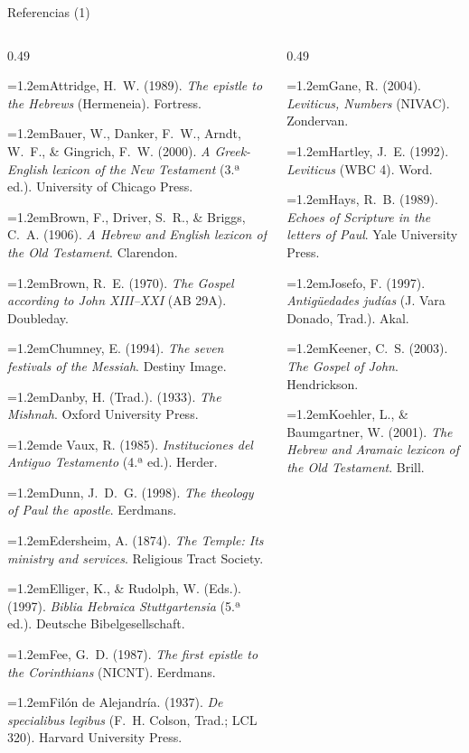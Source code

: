 \documentclass[hyperref={bookmarks=false},aspectratio=169]{beamer}
\newcommand{\refapa}[1]{\par{\RaggedRight\hangindent=1.2em\hangafter=1\noindent #1\par}\vspace{3pt}}
\begin{document}
\begin{frame}{Referencias (1)}
\fontsize{6.2}{7.4}\selectfont
\begin{columns}[t,onlytextwidth]
\begin{column}{0.49\textwidth}
\refapa{Attridge, H.~W. (1989). \emph{The epistle to the Hebrews} (Hermeneia). Fortress.}
\refapa{Bauer, W., Danker, F.~W., Arndt, W.~F., \& Gingrich, F.~W. (2000). \emph{A Greek-English lexicon of the New Testament} (3.ª ed.). University of Chicago Press.}
\refapa{Brown, F., Driver, S.~R., \& Briggs, C.~A. (1906). \emph{A Hebrew and English lexicon of the Old Testament}. Clarendon.}
\refapa{Brown, R.~E. (1970). \emph{The Gospel according to John XIII--XXI} (AB 29A). Doubleday.}
\refapa{Chumney, E. (1994). \emph{The seven festivals of the Messiah}. Destiny Image.}
\refapa{Danby, H. (Trad.). (1933). \emph{The Mishnah}. Oxford University Press.}
\refapa{de Vaux, R. (1985). \emph{Instituciones del Antiguo Testamento} (4.ª ed.). Herder.}
\refapa{Dunn, J.~D.~G. (1998). \emph{The theology of Paul the apostle}. Eerdmans.}
\refapa{Edersheim, A. (1874). \emph{The Temple: Its ministry and services}. Religious Tract Society.}
\refapa{Elliger, K., \& Rudolph, W. (Eds.). (1997). \emph{Biblia Hebraica Stuttgartensia} (5.ª ed.). Deutsche Bibelgesellschaft.}
\refapa{Fee, G.~D. (1987). \emph{The first epistle to the Corinthians} (NICNT). Eerdmans.}
\refapa{Filón de Alejandría. (1937). \emph{De specialibus legibus} (F.~H. Colson, Trad.; LCL 320). Harvard University Press.}
\end{column}
\begin{column}{0.49\textwidth}
\refapa{Gane, R. (2004). \emph{Leviticus, Numbers} (NIVAC). Zondervan.}
\refapa{Hartley, J.~E. (1992). \emph{Leviticus} (WBC 4). Word.}
\refapa{Hays, R.~B. (1989). \emph{Echoes of Scripture in the letters of Paul}. Yale University Press.}
\refapa{Josefo, F. (1997). \emph{Antigüedades judías} (J. Vara Donado, Trad.). Akal.}
\refapa{Keener, C.~S. (2003). \emph{The Gospel of John}. Hendrickson.}
\refapa{Koehler, L., \& Baumgartner, W. (2001). \emph{The Hebrew and Aramaic lexicon of the Old Testament}. Brill.}
\end{column}
\end{columns}
\end{frame}
\end{document}
